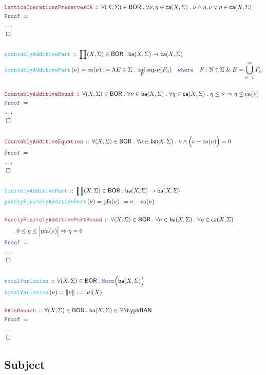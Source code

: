 \documentclass[12pt]{scrartcl}
\newcommand{\TYPE}[1]{\textcolor{NavyBlue}{\mathtt{#1}}}
\newcommand{\FUNC}[1]{\textcolor{Cerulean}{\mathtt{#1}}}
\newcommand{\LOGIC}[1]{\textcolor{Blue}{\mathtt{#1}}}
\newcommand{\THM}[1]{\textcolor{Maroon}{\mathtt{#1}}}
\renewcommand{\.}{\; . \;}
\newcommand{\de}{: \kern 0.1pc =}
\newcommand{\where}{\LOGIC{where}}
\newcommand{\Act}[1]{\left( #1 \right)}
\newcommand{\Theorem}[2]{& \THM{#1} \, :: \, #2 \\ & \Proof = \\ }
\newcommand{\DeclareFunc}[2]{& \FUNC{#1} \, :: \, #2 \\}
\newcommand{\DefineNamedFunc}[4]{&  \FUNC{#1}\Act{#2} = #3 \de #4 \\}
\newcommand{\NewLine}{\\ & \kern 1pc}
\newcommand{\Page}[1]{ \begin{align*} #1 \end{align*}   }
\newcommand{\NoProof}{ & \ldots \\ \EndProof}
\renewcommand{\And}{\; \& \;}
\newcommand{\Imply}{\Rightarrow}
\newcommand{\Reals}{\mathbb{R} }
\newcommand{\Nat}{\mathbb{N} }
\newcommand{\QED}{\; \square}
\newcommand{\EndProof}{& \QED \\}
\newcommand{\Proof}{\LOGIC{Proof} \; }
\newcommand{\BOR}{\mathsf{BOR}}
\newcommand{\caf}{\mathsf{ca}}
\newcommand{\baf}{\mathsf{ba}}
\begin{document}
\Page{
	\Theorem{LatticeOperationsPreservesCA}	
	{
		\forall (X,\Sigma) \in \BOR \.
		\forall \nu,\eta \in \caf(X,\Sigma) \.
		\nu \wedge \eta,  \nu \vee \eta \in \caf(X,\Sigma)
	}
	\NoProof
	\\
	\DeclareFunc{countablyAdditivePart}
	{
		\prod (X,\Sigma) \in \BOR \.
		\baf(X,\Sigma) \to \caf(X,\Sigma)
	}
	\DefineNamedFunc{countablyAdditivePart}
	{\nu}{\mathrm{ca}(\nu)}
	{
		\Lambda E \in \Sigma  \. \inf_F \sup \nu(F_n)
		\quad		
		\where	 
		\quad		
		F : \Nat \uparrow \Sigma \And E = \bigcup^\infty_{n=1} F_n 
	}
	\\
	\Theorem{CountablyAdditiveBound}
	{
		\forall (X,\Sigma) \in \BOR \.
		\forall  \nu \in \baf(X,\Sigma) \.
		\forall \eta \in \caf(X,\Sigma) \.
		\eta \le \nu \Imply \eta \le \mathrm{ca}(\nu)
	}
	\NoProof
	\\
	\Theorem{CountablyAdditiveEquation}
	{
		\forall (X,\Sigma) \in \BOR \.
		\forall  \nu \in \baf(X,\Sigma) \.
		 \nu \wedge \Big(\nu - \mathrm{ca}(\nu) \Big) = 0
	}
	\NoProof
	\\
	\DeclareFunc{finitelyAdditivePart}
	{
		 \prod (X,\Sigma) \in \BOR \.
		\baf(X,\Sigma) \to \baf(X,\Sigma)
	}
	\DefineNamedFunc{purelyFinitelyAdditivePart}
	{  \nu }{\mathrm{pfa}(\nu)}{\nu - \mathrm{ca}(\nu)}
	\\
	\Theorem{PurelyFinitelyAdditivePartBound}
	{
		\forall (X,\Sigma) \in \BOR \.
		\forall  \nu \in \baf(X,\Sigma) \.
		\forall \eta \in \caf(X,\Sigma) \. \NewLine \.
		0 \le \eta \le \Big|\mathrm{pfa}(\nu)\Big| 
		\Imply  \eta = 0 
	}
	\NoProof
	\\
	\DeclareFunc{totalVariation}
	{
		\forall (X,\Sigma) \in \BOR \.
		\TYPE{Norm}\Big(\baf(X,\Sigma)\Big)
	}
	\DefineNamedFunc{totalVariation}{\nu}{\|\nu\|}{|\nu|(X)}
	\\
	\Theorem{BAIsBanach}
	{
		\forall (X,\Sigma) \in \BOR \.
		\baf(X,\Sigma) \in \Reals\hyph\mathsf{BAN}
	}
	\NoProof
}
\newpage
\subsection{Subject}
\end{document}
